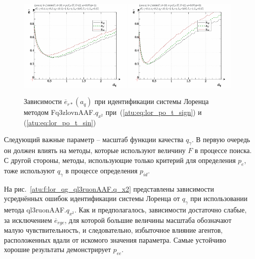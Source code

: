\begin{figure}[ht!]
  \centerline{
    \includegraphics[width=0.49\textwidth]{p/cha/lor/Fq3zlovnAAF/lor_Fq3zlovnAAF_qx2-p_a_q_e_sign.png}
    \hfill
    \includegraphics[width=0.49\textwidth]{p/cha/lor/Fq3zlovnAAF/lor_Fq3zlovnAAF_qx2-p_a_q_e_sin.png}
  }
  \caption{Зависимости $\overline{e}_{r*}(a_q)$ при идентификации системы Лоренца методом Fq3zlovnAAF.$q_{x^2}$
   при~(\ref{atu:eq:lor_po_t_sign}) и (\ref{atu:eq:lor_po_t_sin})}
  \label{atu:f:lor_a_q_Fq3zlovnAAF.q_x2}
\end{figure}


Следующий важные параметр -- масштаб функции качества $q_\gamma$.
В первую очередь он должен влиять на методы,
которые используют величину $F$ в процессе поиска.
С другой стороны, методы, использующие только критерий для
определения $p_e$, тоже используют  $q_\gamma$ в процессе
определения $p_{id}$.

На рис.~\ref{atu:f:lor_qg_ql3ruonAAF.q_x2} представлены зависимости
усреднённых ошибок идентификации системы Лоренца от $q_\gamma$ при использовании метода ql3ruonAAF.$q_{x^2}$.
Как и предполагалось, зависимости достаточно слабые, за исключением $\overline{e}_{rge}$,
для которой большие величины масштаба обозначают малую чувствительность,
и следовательно, избыточное влияние агентов, расположенных
вдали от искомого значения параметра.
Самые устойчиво хорошие результаты демонстрирует $p_{ee}$.

